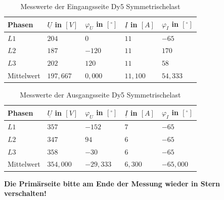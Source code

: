 \begin{enumerate}[label=\alph*)]
        \begin{table}[h!]
          \caption{Messwerte der Eingangsseite Dy5 Symmetrischelast}
          \centering
          \begin{tabular}{lllll}
            \\ \hline
            Phasen     & $\underline{U}$ in $[V]$ & $\varphi_{U}$ in $[^\circ]$ & $\underline{I}$ in $[A]$ & $\varphi_{I}$ in $[^\circ]$ \\ \hline
            $L1$       & $204$                    & $0$                         & $11$                     & $-65$                       \\
            $L2$       & $187$                    & $-120$                      & $11$                     & $170$                       \\
            $L3$       & $202$                    & $120$                       & $11$                     & $58$                        \\ \hline
            Mittelwert & $197,667$                & $0,000$                     & $11,100$                 & $54,333$                    \\ \hline\hline
          \end{tabular}
        \end{table}
        \begin{table}[h!]
          \centering
          \caption{Messwerte der Ausgangsseite Dy5 Symmetrischelast}
          \begin{tabular}{lllll}
            \\ \hline
            Phasen     & $\underline{U}$ in $[V]$ & $\varphi_{U}$ in $[^\circ]$ & $\underline{I}$ in $[A]$ & $\varphi_{I}$ in $[^\circ]$ \\ \hline
            $L1$       & $357$                    & $-152$                      & $7$                      & $-65$                       \\
            $L2$       & $347$                    & $94$                        & $6$                      & $-65$                       \\
            $L3$       & $358$                    & $-30$                       & $6$                      & $-65$                       \\ \hline
            Mittelwert & $354,000$                & $-29,333$                   & $6,300$                  & $-65,000$                   \\ \hline\hline
          \end{tabular}
        \end{table}
\end{enumerate}
\textbf{Die Primärseite bitte am Ende der Messung wieder in Stern verschalten! }
